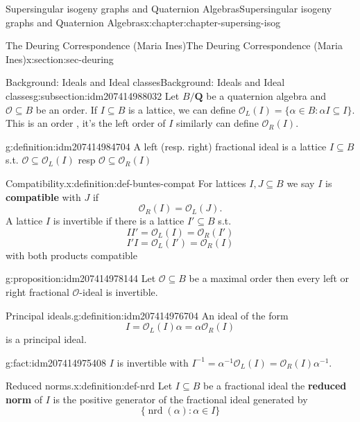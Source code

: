 \documentclass[oneside,10pt,]{book}
\newcommand{\terminology}[1]{\textbf{#1}}
\numberwithin{equation}{section}
\newcommand{\inv}{^{-1}}
\newcommand{\QQ}{\mathbf{Q}}
\newcommand{\ints}{\mathcal{O}}
\begin{document}
\begin{chapterptx}{Supersingular isogeny graphs and Quaternion Algebras}{}{Supersingular isogeny graphs and Quaternion Algebras}{}{}{x:chapter:chapter-supersing-isog}
\begin{sectionptx}{The Deuring Correspondence (Maria Ines)}{}{The Deuring Correspondence (Maria Ines)}{}{}{x:section:sec-deuring}
\begin{subsectionptx}{Background: Ideals and Ideal classes}{}{Background: Ideals and Ideal classes}{}{}{g:subsection:idm207414988032}
Let \(B/\QQ\) be a quaternion algebra and  \(\ints \subseteq B\) be an order. If \(I \subseteq B \) is a  lattice, we can define \(\ints_L (I) = \{ \alpha\in  B :  \alpha I  \subseteq I \}\). This is an order , it's the left order of  \(I\) similarly can define \(\ints_R (I) \).%
\begin{definition}{}{g:definition:idm207414984704}%
A left (resp. right) fractional ideal is a lattice \(I \subseteq B\) s.t. \(\ints \subseteq       \ints_L (I) \) resp \(\ints \subseteq \ints_R (I) \)%
\end{definition}
\begin{definition}{Compatibility.}{x:definition:def-buntes-compat}%
For lattices \(I,J \subseteq B\) we say \(I\) is \terminology{compatible} with \(J\) if%
\begin{equation*}
\ints_R(I)= \ints_L(J)\text{.}
\end{equation*}
A lattice \(I \) is invertible if there is a lattice \(I' \subseteq B\) s.t.%
\begin{equation*}
II' = \ints_L(I) =  \ints_R(I')
\end{equation*}
%
\begin{equation*}
I'I = \ints_L(I') =  \ints_R(I)
\end{equation*}
with both products compatible%
\end{definition}
\begin{proposition}{}{}{g:proposition:idm207414978144}%
Let \(\ints \subseteq B\) be a maximal order then every left or right fractional \(\ints\)-ideal is invertible.%
\end{proposition}
\begin{definition}{Principal ideals.}{g:definition:idm207414976704}%
An ideal of the form%
\begin{equation*}
I =  \ints_L(I) \alpha =  \alpha\ints_R(I)
\end{equation*}
is a principal ideal.%
\end{definition}
\begin{fact}{}{}{g:fact:idm207414975408}%
\(I \) is invertible with \(I\inv = \alpha \inv \ints_L(I) =  \ints_R(I) \alpha \inv\).%
\end{fact}
\begin{definition}{Reduced norms.}{x:definition:def-nrd}%
Let \(I \subseteq B\) be a fractional ideal the \terminology{reduced norm} of \(I \) is the positive generator of the fractional ideal generated by%
\begin{equation*}
\{ \operatorname{nrd} (\alpha) :  \alpha \in I \}
\end{equation*}

\end{definition}
\end{subsectionptx}
\end{sectionptx}
\end{chapterptx}
\end{document}
